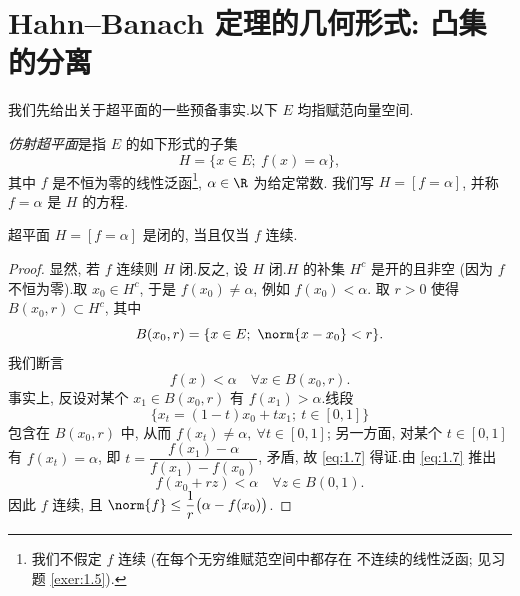 \section{Hahn--Banach 定理的几何形式: 凸集的分离}
\label{sec:1.2}

我们先给出关于超平面的一些预备事实.以下 $E$ 均指赋范向量空间.

\begin{definition}
\emph{仿射超平面}是指 $E$ 的如下形式的子集
\begin{equation*}
H=\{x\in E;\ f(x)=\alpha\},
\end{equation*}
其中 $f$ 是不恒为零的线性泛函\footnote{我们不假定 $f$ 连续 (在每个无穷维赋范空间中都存在
不连续的线性泛函; 见习题  \ref{exer:1.5}).}, $\alpha\in\R$ 为给定常数.
我们写 $H=[f=\alpha]$, 并称 $f=\alpha$ 是 $H$ 的方程.
\end{definition}

\begin{proposition}
\label{prop:1.5}
超平面 $H=[f=\alpha]$ 是闭的, 当且仅当 $f$ 连续.
\end{proposition}

\begin{proof}
显然, 若 $f$ 连续则 $H$ 闭.反之, 设 $H$ 闭.$H$ 的补集 $H^c$ 是开的且非空
(因为 $f$ 不恒为零).取 $x_0\in H^c$, 于是 $f(x_0)\ne\alpha$, 例如 $f(x_0)<\alpha$.
取 $r>0$ 使得 $B(x_0,r)\subset H^c$, 其中
\begin{equation*}
B(x_0,r)=\{x\in E;\ \norm{x-x_0}<r\}.
\end{equation*}
我们断言
\begin{equation}
f(x)<\alpha\quad \forall x\in B(x_0,r).
  \label{eq:1.7}
\end{equation}
事实上, 反设对某个 $x_1\in B(x_0,r)$ 有 $f(x_1)>\alpha$.线段
\begin{equation*}
\{x_t=(1-t)x_0+tx_1;\ t\in[0,1]\}
\end{equation*}
包含在 $B(x_0,r)$ 中, 从而 $f(x_t)\ne\alpha,\ \forall t\in[0,1]$; 另一方面, 对某个
$t\in[0,1]$ 有 $f(x_t)=\alpha$, 即 $t=\dfrac{f(x_1)-\alpha}{f(x_1)-f(x_0)}$,
矛盾, 故 \eqref{eq:1.7} 得证.由 \eqref{eq:1.7} 推出
\begin{equation*}
f(x_0+rz)<\alpha\quad \forall z\in B(0,1).
\end{equation*}
因此 $f$ 连续, 且 $\norm{f}\le\dfrac{1}{r}\bigl(\alpha-f(x_0)\bigr)$.
\end{proof}

